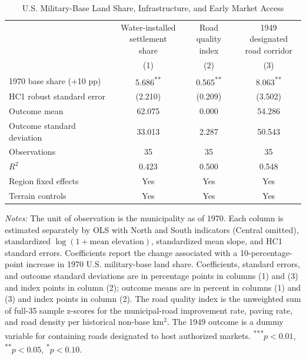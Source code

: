 \documentclass[12pt, unicode, a4paper]{article}
\newcommand{\1}{\mbox{1}\hspace{-0.25em}\mbox{l}} %
\begin{document}
{
\begin{table}[!htbp]
\centering
\caption{U.S. Military-Base Land Share, Infrastructure, and Early Market Access}
\label{tab:base_channels_1970_four_channels}
\footnotesize
\setlength{\tabcolsep}{5pt}
\begin{tabular}{@{}lccc@{}}
\toprule
 & \shortstack{Water-installed\\settlement share} & \shortstack{Road quality\\index} & \shortstack{1949 designated\\road corridor} \\
 & (1) & (2) & (3) \\
\midrule
1970 base share (+10 pp) & 5.686\textsuperscript{**} & 0.565\textsuperscript{**} & 8.063\textsuperscript{**} \\
HC1 robust standard error & (2.210) & (0.209) & (3.502) \\
\addlinespace
Outcome mean & 62.075 & 0.000 & 54.286 \\
Outcome standard deviation & 33.013 & 2.287 & 50.543 \\
Observations & 35 & 35 & 35 \\
\(R^{2}\) & 0.423 & 0.500 & 0.548 \\
Region fixed effects & Yes & Yes & Yes \\
Terrain controls & Yes & Yes & Yes \\
\bottomrule
\end{tabular}
\par\smallskip
\parbox{0.98\linewidth}{\scriptsize \textit{Notes:} The unit of observation is the municipality as of 1970. Each column is estimated separately by OLS with North and South indicators (Central omitted), standardized $\log(1+\text{mean elevation})$, standardized mean slope, and HC1 standard errors. Coefficients report the change associated with a 10-percentage-point increase in 1970 U.S. military-base land share. Coefficients, standard errors, and outcome standard deviations are in percentage points in columns (1) and (3) and index points in column (2); outcome means are in percent in columns (1) and (3) and index points in column (2). The road quality index is the unweighted sum of full-35 sample z-scores for the municipal-road improvement rate, paving rate, and road density per historical non-base km$^2$. The 1949 outcome is a dummy variable for containing roads designated to host authorized markets.  \textsuperscript{***}\(p<0.01\), \textsuperscript{**}\(p<0.05\), \textsuperscript{*}\(p<0.10\).}
\end{table}
}
\end{document}
